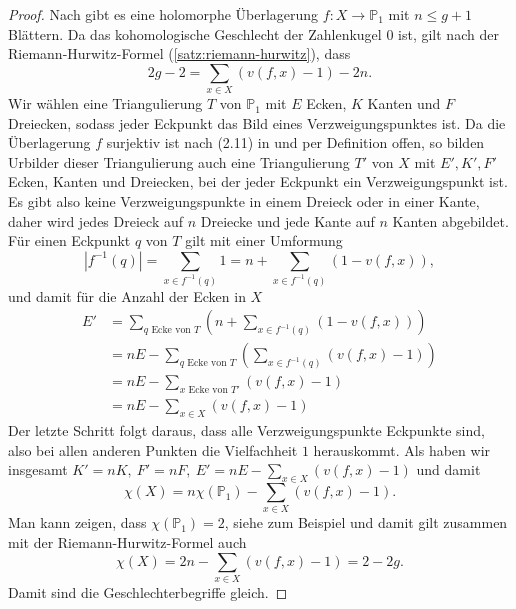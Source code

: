 \documentclass[11pt,a4paper,toc=bibliography]{scrartcl}
\theoremstyle{def}
\theoremstyle{thm}
\theoremstyle{remark}
\begin{document}
\begin{proof}
Nach  gibt es eine holomorphe Überlagerung $f:X\rightarrow \mathbb{P}_1$ mit $n\leq g+1$ Blättern. Da das kohomologische Geschlecht der Zahlenkugel $0$ ist, gilt nach der Riemann-Hurwitz-Formel (\ref{satz:riemann-hurwitz}), dass
\[
2g-2=\sum_{x\in X}(v(f,x)-1)-2n.
\]
Wir wählen eine Triangulierung $T$ von $\mathbb{P}_1$ mit $E$ Ecken, $K$ Kanten und $F$ Dreiecken, sodass jeder Eckpunkt das Bild eines Verzweigungspunktes ist. Da die Überlagerung $f$ surjektiv ist nach (2.11) in \cite[~S.11]{forster} und per Definition offen, so bilden Urbilder dieser Triangulierung auch eine Triangulierung $T'$ von $X$ mit $E',K',F'$ Ecken, Kanten und Dreiecken, bei der jeder Eckpunkt ein Verzweigungspunkt ist. Es gibt also keine Verzweigungspunkte in einem Dreieck oder in einer Kante, daher wird jedes Dreieck auf $n$ Dreiecke und jede Kante auf $n$ Kanten abgebildet. Für einen Eckpunkt $q$ von $T$ gilt mit einer Umformung
\[
|f^{-1}(q)|=\sum_{x\in f^{-1}(q)} 1 = n + \sum_{x\in f^{-1}(q)}(1-v(f,x)),
\]
und damit für die Anzahl der Ecken in $X$ 
\begin{align*}
    E' &= \sum_{q \text{ Ecke von } T} \left(  n + \sum_{x\in f^{-1}(q)}(1-v(f,x))\right)\\
        &=n E -\sum_{q \text{ Ecke von } T} \left(\sum_{x\in f^{-1}(q)}(v(f,x)-1)\right)\\
        &=n E-\sum_{x \text{ Ecke von } T'}(v(f,x)-1)\\
        &=n E-\sum_{x\in X}(v(f,x)-1)
\end{align*}
Der letzte Schritt folgt daraus, dass alle Verzweigungspunkte Eckpunkte sind, also bei allen anderen Punkten die Vielfachheit $1$ herauskommt.
Als haben wir insgesamt $K'=nK,~F'=nF,~ E'=n E-\sum_{x\in X}(v(f,x)-1)$ und damit
\[
\chi(X) = n\chi(\mathbb{P}_1)-\sum_{x\in X}(v(f,x)-1).
\]
Man kann zeigen, dass $\chi(\mathbb{P}_1)=2$, siehe zum Beispiel \cite[~S.162]{geomTop} und damit gilt zusammen mit der Riemann-Hurwitz-Formel auch
\[
\chi(X) = 2n-\sum_{x\in X}(v(f,x)-1)= 2-2g.
\]
Damit sind die Geschlechterbegriffe gleich.
\end{proof}
\newpage

\end{document}
